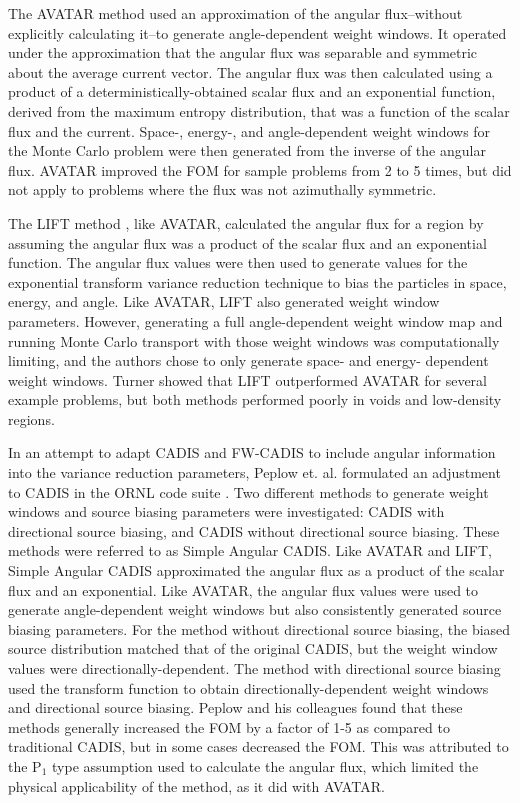 The AVATAR method
\cite{van_riper_generation_1995, van_riper_avatarautomatic_1997} used an
approximation of the angular flux--without explicitly calculating it--to
generate angle-dependent weight windows. It operated under the approximation
that
the angular flux was separable and symmetric about the average current vector.
The angular flux was then calculated using
a product of a deterministically-obtained
scalar flux and an exponential function, derived from the
maximum entropy distribution, that was a function of the scalar flux and the
current. Space-, energy-, and angle-dependent weight windows for
the Monte Carlo problem were then generated from the inverse of the angular
flux. AVATAR improved the FOM for sample problems from 2 to 5 times, but did not
apply to problems where the flux was not azimuthally symmetric.

The LIFT method \cite{turner_automatic_1997, turner_automatic_1997-1}, like
AVATAR, calculated the angular flux for a region by assuming the angular flux
was a product of the scalar flux and an exponential function. The angular flux
values were then used to generate values for the exponential transform variance
reduction
technique to bias the particles in space, energy, and angle. Like AVATAR, LIFT
also generated weight window parameters. However, generating a full
angle-dependent weight window map and running Monte Carlo transport with those
weight windows was computationally limiting, and the authors chose to only
generate space- and energy- dependent weight windows. Turner showed that LIFT
outperformed AVATAR for several example problems, but both methods performed
poorly in voids and low-density regions.

In an attempt to adapt CADIS and FW-CADIS to include angular information into
the variance reduction parameters,
Peplow et. al. formulated an adjustment to CADIS in the ORNL
code suite \cite{peplow_consistent_2012}. Two different
methods to generate weight windows and source biasing parameters
were investigated:
CADIS with directional source biasing, and CADIS without directional source
biasing. These methods were referred to as Simple Angular CADIS. Like AVATAR and
LIFT, Simple Angular CADIS approximated the angular flux as a product of the
scalar flux and an exponential. Like AVATAR, the angular flux values
were used to
generate angle-dependent weight windows but also consistently generated source
biasing parameters. For the method without
directional source biasing, the biased source distribution matched that of the
original CADIS, but the weight window values were directionally-dependent. The
method with directional source biasing used the transform function to obtain
directionally-dependent weight windows and directional source biasing.
Peplow and his colleagues found
that these methods generally increased the FOM by a factor of 1-5 as compared to
traditional CADIS, but in some
cases decreased the FOM. This was attributed to the P$_1$ type assumption used
to calculate the angular flux, which limited the physical applicability of the
method, as it did with AVATAR.

